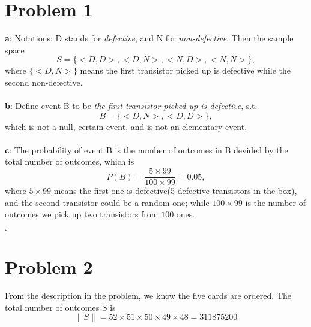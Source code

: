 \documentclass[12pt,letterpaper]{article}
\begin{document}
\section*{Problem 1}
    \textbf{a}: Notations: D stands for \textit{defective}, and N for \textit{non-defective}. Then the sample space
        \begin{equation}
            S = \{<D, D>, <D, N>, <N, D>, <N, N>\},
        \end{equation}
        where $\{<D, N>\}$ means the first transistor picked up is defective while the second non-defective.
    \\ \\
    \textbf{b}: Define event B to be \textit{the first transistor picked up is defective}, s.t.
        \begin{equation}
            B = \{<D, N>, <D, D>\},
        \end{equation}
    which is not a null, certain event, and is not an elementary event.
    \\ \\
    \textbf{c}: The probability of event B is the number of outcomes in B devided by the total number of outcomes, which is
        \begin{equation}
            P(B) = \frac{5 \times 99}{100 \times 99} = 0.05,
        \end{equation}
    where $5 \times 99$ means the first one is defective(5 defective transistors in the box), and the second transistor could be a random one; while $100 \times 99$ is the number of outcomes we pick up two transistors from $100$ ones.

    \hfill\ensuremath{\square}

\section*{Problem 2}

    From the description in the problem, we know the five cards are ordered. The total number of outcomes $S$ is
        \begin{equation}
            \|S\| = 52 \times 51 \times 50 \times 49 \times 48 = 311875200
        \end{equation}
\end{document}
